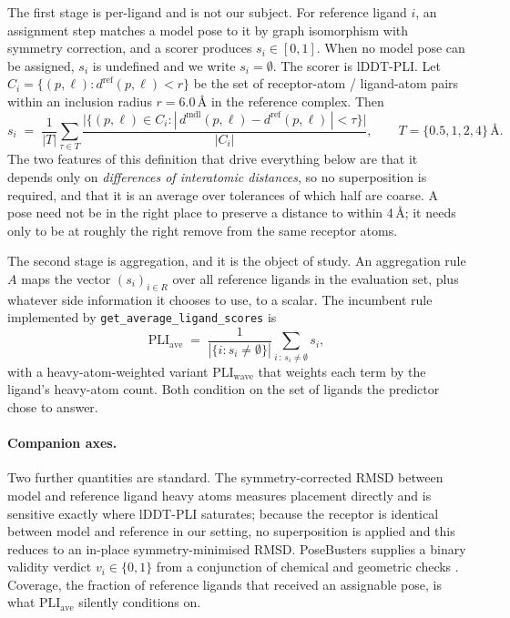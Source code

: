 \documentclass{article} %
\begin{document}
The first stage is per-ligand and is not our subject. For reference ligand $i$, an
assignment step matches a model pose to it by graph isomorphism with symmetry
correction, and a scorer produces $s_i \in [0,1]$. When no model pose can be assigned,
$s_i$ is undefined and we write $s_i = \emptyset$. The scorer is lDDT-PLI. Let
$C_i = \{(p,\ell) : d^{\text{ref}}(p,\ell) < r\}$ be the set of receptor-atom /
ligand-atom pairs within an inclusion radius $r = 6.0$\,\AA{} in the reference complex.
Then
$$
s_i \;=\; \frac{1}{|T|}\sum_{\tau \in T}
\frac{\bigl|\{(p,\ell) \in C_i : |\,d^{\text{mdl}}(p,\ell) - d^{\text{ref}}(p,\ell)\,| < \tau\}\bigr|}{|C_i|},
\qquad T = \{0.5, 1, 2, 4\}\,\text{\AA{}} .
$$
The two features of this definition that drive everything below are that it depends only
on \emph{differences of interatomic distances}, so no superposition is required, and
that it is an average over tolerances of which half are coarse. A pose need not be in
the right place to preserve a distance to within 4\,\AA{}; it needs only to be at
roughly the right remove from the same receptor atoms.

The second stage is aggregation, and it is the object of study. An aggregation rule $A$
maps the vector $(s_i)_{i \in R}$ over all reference ligands in the evaluation set, plus
whatever side information it chooses to use, to a scalar. The incumbent rule implemented
by \texttt{get\_average\_ligand\_scores} is
$$
\mathrm{PLI}_{\text{ave}} \;=\; \frac{1}{|\{i : s_i \neq \emptyset\}|}\sum_{i \,:\, s_i \neq \emptyset} s_i ,
$$
with a heavy-atom-weighted variant $\mathrm{PLI}_{\text{wave}}$ that weights each term by
the ligand's heavy-atom count. Both condition on the set of ligands the predictor chose
to answer.

\paragraph{Companion axes.} Two further quantities are standard. The symmetry-corrected
RMSD between model and reference ligand heavy atoms measures placement directly and is
sensitive exactly where lDDT-PLI saturates; because the receptor is identical between
model and reference in our setting, no superposition is applied and this reduces to an
in-place symmetry-minimised RMSD. PoseBusters supplies a binary validity verdict
$v_i \in \{0,1\}$ from a conjunction of chemical and geometric checks
\citep{buttenschoen-2023-posebusters}. Coverage, the fraction of reference ligands that
received an assignable pose, is what $\mathrm{PLI}_{\text{ave}}$ silently conditions on.
\end{document}
